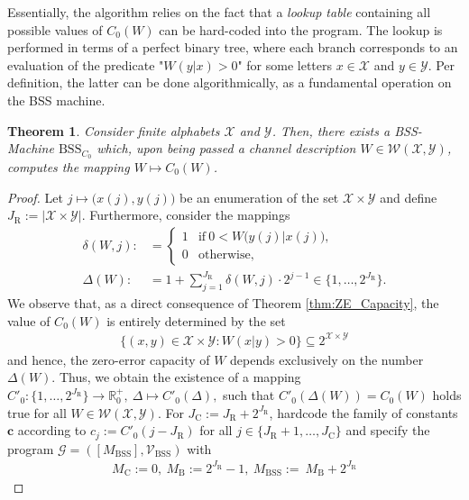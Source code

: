 \documentclass[conference]{IEEEtran}
\def\X{{\mathcal X}}
\def\Y{{\mathcal Y}}
\def\G{{\mathcal G}}
\def\V{{\mathcal V}}
\def\W{{\mathcal W}}
\def\RR{{\mathbb R}}
\newcommand{\BSS}{\mathrm{BSS}}
\newtheorem{Theorem}{Theorem}
\begin{document}
	Essentially, the algorithm relies on the fact that a \emph{lookup table} containing all possible values of \(C_0(W)\) can be hard-coded into the program. The lookup is performed in 
	terms of a perfect binary tree, where each branch corresponds to an evaluation of the predicate "\(W(y|x) > 0\)" for some letters \(x\in\X\) and \(y\in\Y\). Per definition, the latter 
	can be done algorithmically, as a fundamental operation on the BSS machine.

	\begin{Theorem}	\label{thm:ZeroErrorBSScomputable}
					Consider finite alphabets \(\X\) and \(\Y\). Then, there exists a BSS-Machine \(\BSS_{C_0}\)
					which, upon being passed a channel description \(W\in \W(\X,\Y)\), computes the mapping \(W \mapsto C_0(W)\).
	\end{Theorem}\begin{proof}
					Let \(j \mapsto \big(x(j), y(j)\big)\) be an enumeration of the set \(\X\times\Y\) and define
					\(J_\mathrm{R} := |\X\times \Y|\). Furthermore, consider the mappings
					\begin{align*}	\delta(W,j) :&=     \begin{cases}   1   &\text{if}~ 0 < W\big(y(j)|x(j)\big), \\
																		0   &\text{otherwise},
														\end{cases}\\
									\Delta(W)   :&=     1 + {\sum}_{j=1}^{J_\mathrm{R}} \delta(W,j)\cdot 2^{j-1} \in \big\{1,\ldots,2^{J_\mathrm{R}}\big\}.
					\end{align*} 
					We observe that, as a direct consequence of Theorem \ref{thm:ZE_Capacity}, the value of \(C_0(W)\) is 
					entirely determined by the set 
					\begin{align*}   \{(x,y) \in \X\times \Y : W(x|y) > 0\} \subseteq 2^{\X\times\Y}
					\end{align*} 
					and hence, the zero-error capacity of \(W\) depends exclusively on the number \(\Delta(W)\). Thus, we obtain the existence of a mapping
					\(C'_0 : \big\{1,\ldots,2^{J_\mathrm{R}}\big\} \rightarrow \RR_0^+,~ \Delta \mapsto C'_0(\Delta),        
					\)
					such that \(C'_0(\Delta(W)) = C_0(W)\) holds true for all \(W\in\W(\X,\Y)\). For \(J_\mathrm{C} := J_\mathrm{R} + 2^{J_\mathrm{R}}\), 
					hardcode the family of constants \(\bm{c}\) according to 
					\(  c_j := C'_0(j - J_\mathrm{R})
					\)
					for all \(j\in \{J_\mathrm{R} + 1, \ldots, J_\mathrm{C}\}\) and specify the program \(\G = ([M_\BSS],\V_\BSS)\) with
					\begin{align*}	M_\mathrm{C} := 0,~M_\mathrm{B} := 2^{J_\mathrm{R}} - 1,~ M_\BSS := ~M_\mathrm{B} + 2^{J_\mathrm{R}}

\end{align*}
\end{proof}
\end{document}

